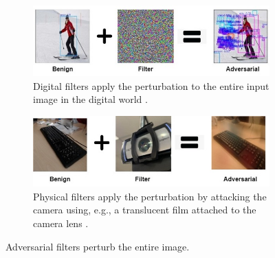 \begin{figure}[H]
    \centering
    \begin{subfigure}[b]{\textwidth}
        \includegraphics[width=\linewidth]{figures/chapter_detection/detection/digital_filter.jpg}
        \caption{Digital filters apply the perturbation to the entire input image in the digital world \citep{wang2021daedalus}.}
        \label{fig:digital_filter}
    \end{subfigure}
    \begin{subfigure}[b]{\textwidth}
        \includegraphics[width=\linewidth]{figures/chapter_detection/detection/physical_filter.jpg}
        \caption{Physical filters apply the perturbation by attacking the camera using, e.g., a translucent film attached to the camera lens \citep{li2019adversarial}.}
        \label{fig:physical_filter}
    \end{subfigure}
    \caption{Adversarial filters perturb the entire image.}
    \label{fig:filter}
\end{figure}

